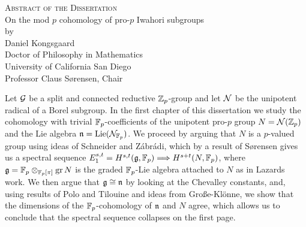 \documentclass[letterpaper,oneside,english,11pt,openany]{memoir}
\begin{document}

\begin{center}
  {\Large\scshape Abstract of the Dissertation}\\[1.5em]
  {\large On the mod \texorpdfstring{$p$}{p} cohomology of pro-\texorpdfstring{$p$}{p} Iwahori subgroups}\\[1.5em]
  by \\[1.5em]
  Daniel Kongsgaard \\[1em]
  Doctor of Philosophy in Mathematics \\[1em]
  University of California San Diego \\[1.5em]
  Professor Claus Sørensen, Chair \\[2em]
\end{center}

Let $\mathcal{G}$ be a split and connected reductive $\mathbb{Z}_{p}$-group and let $\mathcal{N}$ be the unipotent radical of a Borel subgroup. In the first chapter of this dissertation we study the cohomology with trivial $\mathbb{F}_{p}$-coefficients of the unipotent pro-$p$ group $N = \mathcal{N}(\mathbb{Z}_{p})$ and the Lie algebra $\mathfrak{n} = \operatorname{Lie}(\mathcal{N}_{\mathbb{F}_{p}})$. We proceed by arguing that $N$ is a $p$-valued group using ideas of Schneider and Zábrádi, which by a result of Sørensen gives us a spectral sequence $E_{1}^{s,t} = H^{s,t}(\mathfrak{g},\mathbb{F}_{p}) \Longrightarrow H^{s+t}(N,\mathbb{F}_{p})$, where $\mathfrak{g} = \mathbb{F}_{p} \otimes_{\mathbb{F}_{p}[\pi]} \operatorname{gr} N$ is the graded $\mathbb{F}_{p}$-Lie algebra attached to $N$ as in Lazards work. We then argue that $\mathfrak{g} \cong \mathfrak{n}$ by looking at the Chevalley constants, and, using results of Polo and Tilouine and ideas from Große-Klönne, we show that the dimensions of the $\mathbb{F}_{p}$-cohomology of $\mathfrak{n}$ and $N$ agree, which allows us to conclude that the spectral sequence collapses on the first page.
\end{document}
